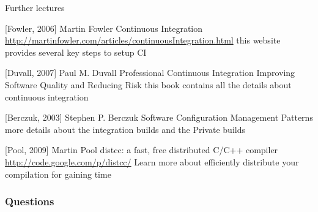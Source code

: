 \documentclass[handout]{beamer}
\begin{document}
\begin{frame}{Further lectures}
\begin{thebibliography}{8}

[Fowler, 2006]
	Martin Fowler
	\newblock Continuous Integration
	\url{http://martinfowler.com/articles/continuousIntegration.html}
	\newblock this website provides several key steps to setup CI

[Duvall, 2007]
	Paul M. Duvall
	\newblock Professional Continuous Integration Improving Software Quality and
	Reducing Risk
	\newblock this book contains all the details about continuous integration

[Berczuk, 2003]
	Stephen P. Berczuk
	\newblock Software Configuration Management Patterns
	\newblock more details about the integration builds and the Private builds
	
[Pool, 2009]
	Martin Pool
	\newblock distcc: a fast, free distributed C/C++ compiler
	\url{http://code.google.com/p/distcc/}
	\newblock Learn more about efficiently distribute your compilation for gaining
	time

\end{thebibliography}
\end{frame}

\begin{frame}
\frametitle{Questions}
\end{frame}
\end{document}
